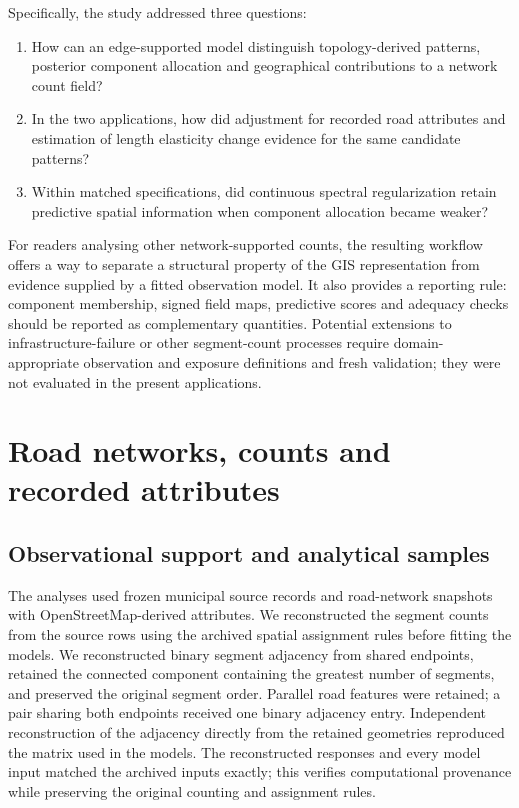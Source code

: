 \documentclass[11pt]{article}
\begin{document}
Specifically, the study addressed three questions:
\begin{enumerate}
\item How can an edge-supported model distinguish topology-derived patterns, posterior component allocation and geographical contributions to a network count field?
\item In the two applications, how did adjustment for recorded road attributes and estimation of length elasticity change evidence for the same candidate patterns?
\item Within matched specifications, did continuous spectral regularization retain predictive spatial information when component allocation became weaker?
\end{enumerate}

For readers analysing other network-supported counts, the resulting workflow offers a way to separate a structural property of the GIS representation from evidence supplied by a fitted observation model. It also provides a reporting rule: component membership, signed field maps, predictive scores and adequacy checks should be reported as complementary quantities. Potential extensions to infrastructure-failure or other segment-count processes require domain-appropriate observation and exposure definitions and fresh validation; they were not evaluated in the present applications.

\section{Road networks, counts and recorded attributes}
\subsection{Observational support and analytical samples}
The analyses used frozen municipal source records and road-network snapshots with OpenStreetMap-derived attributes. We reconstructed the segment counts from the source rows using the archived spatial assignment rules before fitting the models. We reconstructed binary segment adjacency from shared endpoints, retained the connected component containing the greatest number of segments, and preserved the original segment order. Parallel road features were retained; a pair sharing both endpoints received one binary adjacency entry. Independent reconstruction of the adjacency directly from the retained geometries reproduced the matrix used in the models. The reconstructed responses and every model input matched the archived inputs exactly; this verifies computational provenance while preserving the original counting and assignment rules.
\end{document}
